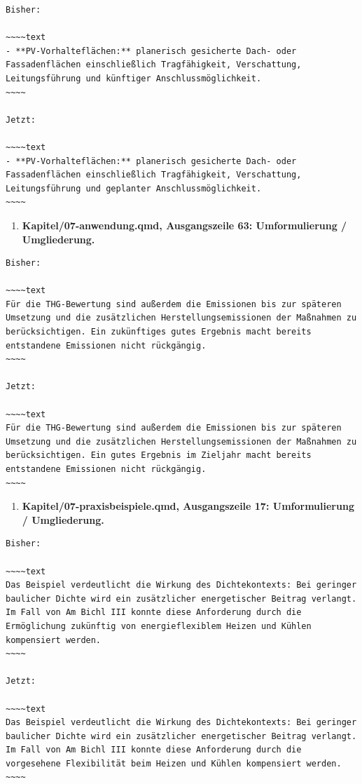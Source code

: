 \documentclass[
  ngerman,
  a4paper,
  DIV=11]{scrreprt}
\providecommand{\tightlist}{%
  \setlength{\itemsep}{0pt}\setlength{\parskip}{0pt}}
\begin{document}
\begin{verbatim}
Bisher:

~~~~text
- **PV-Vorhalteflächen:** planerisch gesicherte Dach- oder Fassadenflächen einschließlich Tragfähigkeit, Verschattung, Leitungsführung und künftiger Anschlussmöglichkeit.
~~~~

Jetzt:

~~~~text
- **PV-Vorhalteflächen:** planerisch gesicherte Dach- oder Fassadenflächen einschließlich Tragfähigkeit, Verschattung, Leitungsführung und geplanter Anschlussmöglichkeit.
~~~~
\end{verbatim}

\begin{enumerate}
\def\labelenumi{\arabic{enumi}.}
\setcounter{enumi}{127}
\tightlist
\item
  \textbf{Kapitel/07-anwendung.qmd, Ausgangszeile 63: Umformulierung /
  Umgliederung.}
\end{enumerate}

\begin{verbatim}
Bisher:

~~~~text
Für die THG-Bewertung sind außerdem die Emissionen bis zur späteren Umsetzung und die zusätzlichen Herstellungsemissionen der Maßnahmen zu berücksichtigen. Ein zukünftiges gutes Ergebnis macht bereits entstandene Emissionen nicht rückgängig.
~~~~

Jetzt:

~~~~text
Für die THG-Bewertung sind außerdem die Emissionen bis zur späteren Umsetzung und die zusätzlichen Herstellungsemissionen der Maßnahmen zu berücksichtigen. Ein gutes Ergebnis im Zieljahr macht bereits entstandene Emissionen nicht rückgängig.
~~~~
\end{verbatim}

\begin{enumerate}
\def\labelenumi{\arabic{enumi}.}
\setcounter{enumi}{128}
\tightlist
\item
  \textbf{Kapitel/07-praxisbeispiele.qmd, Ausgangszeile 17:
  Umformulierung / Umgliederung.}
\end{enumerate}

\begin{verbatim}
Bisher:

~~~~text
Das Beispiel verdeutlicht die Wirkung des Dichtekontexts: Bei geringer baulicher Dichte wird ein zusätzlicher energetischer Beitrag verlangt. Im Fall von Am Bichl III konnte diese Anforderung durch die Ermöglichung zukünftig von energieflexiblem Heizen und Kühlen kompensiert werden.
~~~~

Jetzt:

~~~~text
Das Beispiel verdeutlicht die Wirkung des Dichtekontexts: Bei geringer baulicher Dichte wird ein zusätzlicher energetischer Beitrag verlangt. Im Fall von Am Bichl III konnte diese Anforderung durch die vorgesehene Flexibilität beim Heizen und Kühlen kompensiert werden.
~~~~
\end{verbatim}
\end{document}
